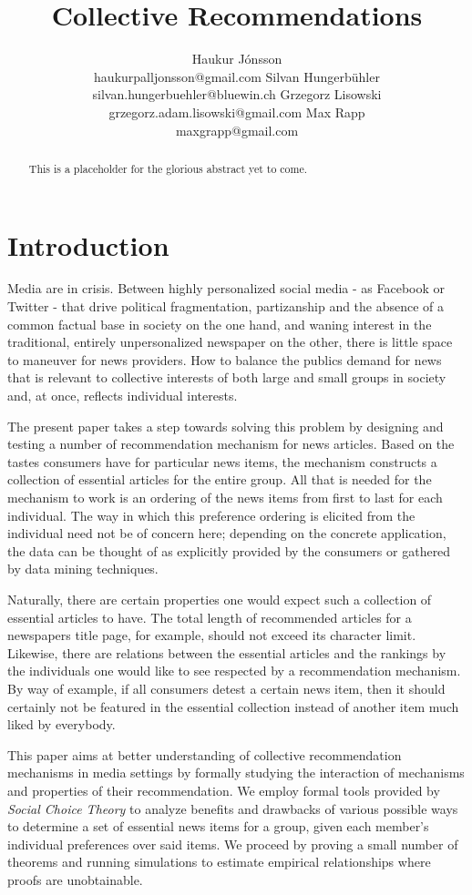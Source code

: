 \documentclass{article}
\title{Collective Recommendations}
\author{
    Haukur J{\'o}nsson \\ haukurpalljonsson@gmail.com \And
    Silvan Hungerb{\"u}hler \\   silvan.hungerbuehler@bluewin.ch \AND
    Grzegorz Lisowski \\  grzegorz.adam.lisowski@gmail.com \And
    Max Rapp \\  maxgrapp@gmail.com
}
\begin{document}
\maketitle

\begin{abstract}
This is a placeholder for the glorious abstract yet to come.
\end{abstract}

\section{Introduction}\label{introduction}
Media are in crisis. Between highly personalized social media - as Facebook or Twitter - that drive political
fragmentation, partizanship and the absence of a common factual base in society on the one hand,
and waning interest in the traditional, entirely unpersonalized newspaper on the other, there is little space to maneuver for news providers.
 How to balance the publics demand for news that is relevant to collective interests of both large and small groups in society and, at once,
 reflects individual interests.

The present paper takes a step towards solving this problem by designing and testing a number of recommendation mechanism for news articles.
 Based on the tastes consumers have for particular news items, the mechanism constructs a collection of essential articles for the entire group.
 All that is needed for the mechanism to work is an ordering of the news items from first to last for each individual.
 The way in which this preference ordering is elicited from the individual need not be of concern here;
 depending on the concrete application, the data can be thought of as explicitly provided by the consumers or gathered by data mining techniques.

Naturally, there are certain properties one would expect such a collection of essential articles to have.
 The total length of recommended articles for a newspapers title page, for example, should not exceed its character limit.
 Likewise, there are relations between the essential articles and the rankings by the individuals one would like to see respected by a recommendation mechanism.
By way of example, if all consumers detest a certain news item,
 then it should certainly not be featured in the essential collection instead of another item much liked by everybody.

This paper aims at better understanding of collective recommendation mechanisms in media settings by
formally studying the interaction of mechanisms and properties of their recommendation.
We employ formal tools provided by {\em Social Choice Theory} to analyze benefits and drawbacks of various possible ways to determine a set of essential news items
for a group, given each member's individual preferences over said items.
We proceed by proving a small number of theorems and running simulations to estimate empirical relationships where proofs are unobtainable.
\end{document}
